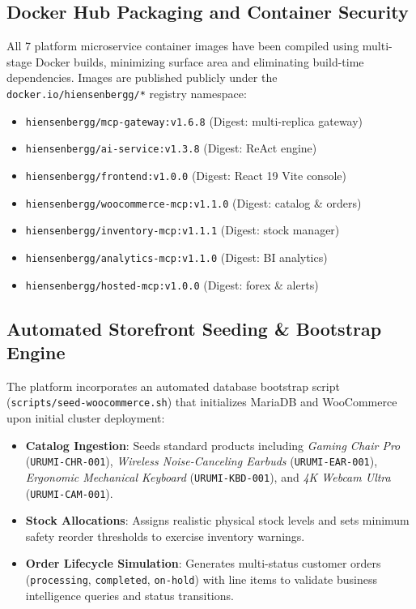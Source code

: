 \documentclass[11pt,a4paper]{article}
\begin{document}
\subsection{Docker Hub Packaging and Container Security}
All 7 platform microservice container images have been compiled using multi-stage Docker builds, minimizing surface area and eliminating build-time dependencies. Images are published publicly under the \texttt{docker.io/hiensenbergg/*} registry namespace:
\begin{itemize}[leftmargin=*]
    \item \texttt{hiensenbergg/mcp-gateway:v1.6.8} (Digest: multi-replica gateway)
    \item \texttt{hiensenbergg/ai-service:v1.3.8} (Digest: ReAct engine)
    \item \texttt{hiensenbergg/frontend:v1.0.0} (Digest: React 19 Vite console)
    \item \texttt{hiensenbergg/woocommerce-mcp:v1.1.0} (Digest: catalog \& orders)
    \item \texttt{hiensenbergg/inventory-mcp:v1.1.1} (Digest: stock manager)
    \item \texttt{hiensenbergg/analytics-mcp:v1.1.0} (Digest: BI analytics)
    \item \texttt{hiensenbergg/hosted-mcp:v1.0.0} (Digest: forex \& alerts)
\end{itemize}

\subsection{Automated Storefront Seeding \& Bootstrap Engine}
The platform incorporates an automated database bootstrap script (\texttt{scripts/seed-woocommerce.sh}) that initializes MariaDB and WooCommerce upon initial cluster deployment:
\begin{itemize}[leftmargin=*]
    \item \textbf{Catalog Ingestion}: Seeds standard products including \textit{Gaming Chair Pro} (\texttt{URUMI-CHR-001}), \textit{Wireless Noise-Canceling Earbuds} (\texttt{URUMI-EAR-001}), \textit{Ergonomic Mechanical Keyboard} (\texttt{URUMI-KBD-001}), and \textit{4K Webcam Ultra} (\texttt{URUMI-CAM-001}).
    \item \textbf{Stock Allocations}: Assigns realistic physical stock levels and sets minimum safety reorder thresholds to exercise inventory warnings.
    \item \textbf{Order Lifecycle Simulation}: Generates multi-status customer orders (\texttt{processing}, \texttt{completed}, \texttt{on-hold}) with line items to validate business intelligence queries and status transitions.
\end{itemize}
\end{document}
